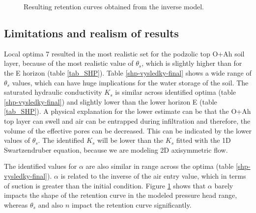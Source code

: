 \documentclass[review,times,3p,10pt]{elsarticle}
\begin{document}
\begin{figure}
\centering
{}
\caption{Resulting retention curves obtained from the inverse model.}
\label{retc-final}
\end{figure}


\subsection{Limitations and realism of results}


Local optima 7 resulted in the most realistic set for the podzolic top O+Ah soil layer, because of the most realistic value of $\theta_s$, which is slightly higher than for the E horizon (table \ref{tab_SHP}). Table \ref{shp-vysledky-final} shows a wide range of $\theta_s$ values, which can have huge implications for the water storage of the soil. The saturated hydraulic conductivity $K_s$ is similar across identified optima (table \ref{shp-vysledky-final}) and slightly lower than the lower horizon E (table \ref{tab_SHP}). A physical explanation for the lower estimate can be that the O+Ah top layer can swell and air can be entrapped during infiltration and therefore, the volume of the effective pores can be decreased. This can be indicated by the lower values of $\theta_s$. The identified $K_s$ will be lower than the $K_s$ fitted with the 1D Swartzendruber equation, because we are modeling 2D axisymmetric flow. 

The identified values for $\alpha$ are also similar in range across the optima (table \ref{shp-vysledky-final}). $\alpha$ is related to the inverse of the air entry value, which in terms of suction is greater than the initial condition. Figure \ref{retc-final} shows that $\alpha$ barely impacts the shape of the retention curve in the modeled pressure head range, whereas $\theta_s$ and also $n$ impact the retention curve significantly. 
\end{document}
